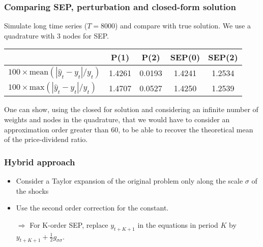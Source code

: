 \documentclass{beamer}
\begin{document}
\begin{frame}
\frametitle{Comparing SEP, perturbation and closed-form solution}

Simulate long time series ($T=8000$) and compare with true solution. We use a quadrature with 3 nodes for SEP.\newline

\bigskip

\begin{tabular}{l|cc|cc}
  \hline
  & P(1) & P(2) & SEP(0) & SEP(2)\\ \hline
  $100\times\textrm{mean}(|\hat y_t - y_t|/y_t)$  & 1.4261 &  0.0193 & 1.4241 &  1.2534\\
  $100\times\textrm{max}(|\hat y_t - y_t|/y_t)$   & 1.4707 &  0.0527 & 1.4250 &  1.2539\\ \hline\hline
\end{tabular}

\bigskip\bigskip

One can show, using the closed for solution and considering an infinite number of weights and nodes in the quadrature, that we would have to consider an approximation order greater than 60, to be able to recover the theoretical mean of the price-dividend ratio.


\end{frame}



\begin{frame}
  \frametitle{Hybrid approach}

\begin{itemize}

  \item Consider a Taylor expansion of the original problem only along the scale $\sigma$ of the shocks\newline

  \item Use the second order correction for the constant.\newline

  \item[$\Rightarrow$] For K-order SEP, replace $y_{t+K+1}$ in the equations in period $K$ by $y_{t+K+1}+\frac{1}{2}g_{\sigma\sigma}$.\newline

\end{itemize}

\bigskip


\end{frame}
\end{document}
